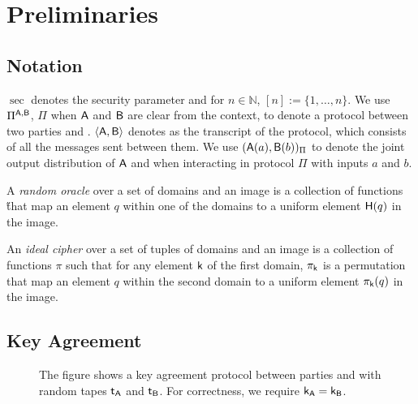 \section{Preliminaries}

\subsection{Notation}
$\sec$ denotes the security parameter and for $n\in\mathbb N$, $[n]:=\{1,\dots,n\}$. We use $\Pi^{\mathsf{A},\mathsf{B}}$, $\Pi$ when $\mathsf{A}$ and $\mathsf{B}$ are clear from the context,  to denote a protocol between two parties \A and \B. $\langle \mathsf{A},\mathsf{B}\rangle$ denotes as the transcript of the protocol, which consists of all the messages sent between them. We use $(\mathsf{A}(a),\mathsf{B}(b))_{\Pi}$ to denote the joint output distribution of $\mathsf{A}$ and \B when interacting in protocol $\Pi$ with inputs $a$ and $b$.


\begin{definition}
A \emph{random oracle} over a set of domains and an image is a collection of functions \H that map an element $q$ within one of the domains  to a uniform element $\mathsf{H}(q)$ in the image.  
\end{definition}


\begin{definition}
An \emph{ideal cipher} over a set of tuples of domains and an image is a collection of functions $\pi$ such that for any element $\mathsf{k}$ of the first domain, $\pi_\mathsf{k}$ is a permutation that map an element $q$ within the second domain to a uniform element $\pi_{\mathsf{k}}(q)$ in the image.  
\end{definition}

\subsection{Key Agreement}

\begin{figure}
\centering
{}
\label{fig:UKA}
\caption{The figure shows a key agreement protocol between parties \A and \B with random tapes $\mathsf{t}_\mathsf{A}$ and $\mathsf{t}_\mathsf{B}$. For correctness, we require $\mathsf{k}_\mathsf{A}=\mathsf{k}_\mathsf{B}$.}
\end{figure}


